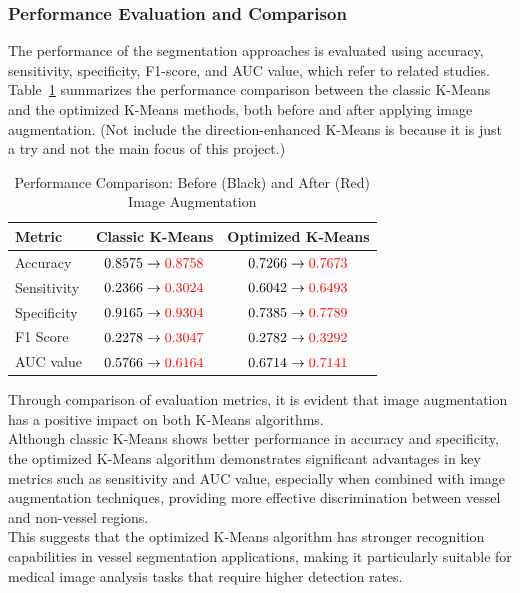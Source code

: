 \documentclass[12pt,letterpaper]{article}
\begin{document}
\subsubsection{Performance Evaluation and Comparison}
The performance of the segmentation approaches is evaluated using accuracy, sensitivity, specificity, F1-score, and AUC value, which refer to related studies. \\
Table~\ref{tab:performance} summarizes the performance comparison between the classic K-Means and the optimized K-Means methods, both before and after applying image augmentation. (Not include the direction-enhanced K-Means is because it is just a try and not the main focus of this project.) 
\begin{table}[H]
    \centering
    \caption{Performance Comparison: Before (Black) and After (Red) Image Augmentation}
    \label{tab:performance}
    \begin{tabular}{lcc}
    \hline
    \textbf{Metric} & \textbf{Classic K-Means} & \textbf{Optimized K-Means} \\
    \hline
    Accuracy & $0.8575 \rightarrow \textcolor{red}{0.8758}$ & $0.7266 \rightarrow \textcolor{red}{0.7673}$ \\
    Sensitivity & $0.2366 \rightarrow \textcolor{red}{0.3024}$ & $0.6042 \rightarrow \textcolor{red}{0.6493}$ \\
    Specificity & $0.9165 \rightarrow \textcolor{red}{0.9304}$ & $0.7385 \rightarrow \textcolor{red}{0.7789}$ \\
    F1 Score   & $0.2278 \rightarrow \textcolor{red}{0.3047}$ & $0.2782 \rightarrow \textcolor{red}{0.3292}$ \\
    AUC value    & $0.5766 \rightarrow \textcolor{red}{0.6164}$ & $0.6714 \rightarrow \textcolor{red}{0.7141}$ \\
    \hline
    \end{tabular}
\end{table}
\noindent
Through comparison of evaluation metrics, it is evident that image augmentation has a positive impact on both K-Means algorithms. \\
Although classic K-Means shows better performance in accuracy and specificity, the optimized K-Means algorithm demonstrates significant advantages in key metrics such as sensitivity and AUC value, especially when combined with image augmentation techniques, providing more effective discrimination between vessel and non-vessel regions. \\
This suggests that the optimized K-Means algorithm has stronger recognition capabilities in vessel segmentation applications, making it particularly suitable for medical image analysis tasks that require higher detection rates.
\end{document}
